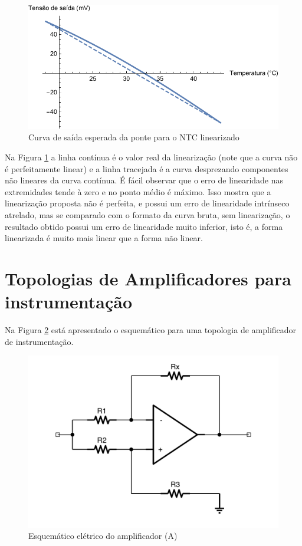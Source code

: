 \documentclass[a4paper]{instrumentacao}
\begin{document}
\begin{figure}[H]
\center
\includegraphics[width=\textwidth]{NTC-Linear-Esperado.pdf}
\caption{Curva de saída esperada da ponte para o NTC linearizado}
\label{fig:ntc-linear-esperado}
\end{figure}

Na Figura \ref{fig:ntc-linear-esperado} a linha contínua é o valor real da linearização (note que a curva não é perfeitamente linear) e a linha tracejada é a curva desprezando componentes não lineares da curva contínua. É fácil observar que o erro de linearidade nas extremidades tende à zero e no ponto médio é máximo. Isso mostra que a linearização proposta não é perfeita, e possui um erro de linearidade intrínseco atrelado, mas se comparado com o formato da curva bruta, sem linearização, o resultado obtido possui um erro de linearidade muito inferior, isto é, a forma linearizada é muito mais linear que a forma não linear.

\section{Topologias de Amplificadores para instrumentação}


Na Figura \ref{fig:amplificador-a} está apresentado o esquemático para uma topologia de amplificador de instrumentação.

\begin{figure}[H]
\center
\includegraphics[width=\textwidth]{Amplificador-A.pdf}
\caption{Esquemático elétrico do amplificador (A)}
\label{fig:amplificador-a}
\end{figure}
\end{document}
